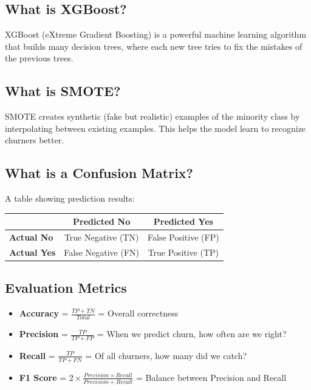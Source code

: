 \documentclass[12pt,a4paper]{article}
\begin{document}
\subsection{What is XGBoost?}
XGBoost (eXtreme Gradient Boosting) is a powerful machine learning algorithm that builds many decision trees, where each new tree tries to fix the mistakes of the previous trees.

\subsection{What is SMOTE?}
SMOTE creates synthetic (fake but realistic) examples of the minority class by interpolating between existing examples. This helps the model learn to recognize churners better.

\subsection{What is a Confusion Matrix?}
A table showing prediction results:

\begin{table}[h]
\centering
\begin{tabular}{@{}lcc@{}}
\toprule
 & \textbf{Predicted No} & \textbf{Predicted Yes} \\ \midrule
\textbf{Actual No} & True Negative (TN) & False Positive (FP) \\
\textbf{Actual Yes} & False Negative (FN) & True Positive (TP) \\ \bottomrule
\end{tabular}
\end{table}

\subsection{Evaluation Metrics}

\begin{itemize}
    \item \textbf{Accuracy} = $\frac{TP + TN}{Total}$ = Overall correctness
    \item \textbf{Precision} = $\frac{TP}{TP + FP}$ = When we predict churn, how often are we right?
    \item \textbf{Recall} = $\frac{TP}{TP + FN}$ = Of all churners, how many did we catch?
    \item \textbf{F1 Score} = $2 \times \frac{Precision \times Recall}{Precision + Recall}$ = Balance between Precision and Recall
\end{itemize}
\end{document}
